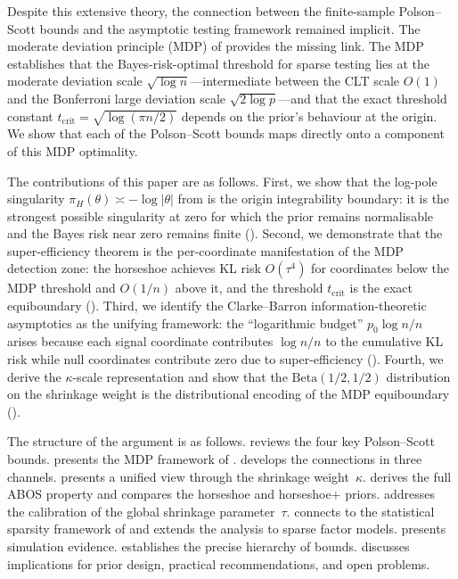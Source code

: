 \documentclass[12pt]{article}
\newcommand{\abs}[1]{\lvert #1 \rvert}
\newcommand{\piH}{\pi_H}
\newcommand{\tcrit}{t_{\mathrm{crit}}}
\begin{document}
Despite this extensive theory, the connection between the finite-sample Polson--Scott bounds and the asymptotic testing framework remained implicit. The moderate deviation principle (MDP) of \citet{datta2026newlook} provides the missing link. The MDP establishes that the Bayes-risk-optimal threshold for sparse testing lies at the moderate deviation scale $\sqrt{\log n}$---intermediate between the CLT scale $O(1)$ and the Bonferroni large deviation scale $\sqrt{2\log p}$---and that the exact threshold constant $\tcrit = \sqrt{\log(\pi n/2)}$ depends on the prior's behaviour at the origin. We show that each of the Polson--Scott bounds maps directly onto a component of this MDP optimality.

The contributions of this paper are as follows. First, we show that the log-pole singularity $\piH(\theta) \asymp -\log\abs{\theta}$ from \citet{carvalho2010horseshoe} is the origin integrability boundary: it is the strongest possible singularity at zero for which the prior remains normalisable and the Bayes risk near zero remains finite (). Second, we demonstrate that the super-efficiency theorem is the per-coordinate manifestation of the MDP detection zone: the horseshoe achieves KL risk $O(\tau^4)$ for coordinates below the MDP threshold and $O(1/n)$ above it, and the threshold $\tcrit$ is the exact equiboundary (). Third, we identify the Clarke--Barron information-theoretic asymptotics as the unifying framework: the ``logarithmic budget'' $p_0 \log n / n$ arises because each signal coordinate contributes $\log n / n$ to the cumulative KL risk while null coordinates contribute zero due to super-efficiency (). Fourth, we derive the $\kappa$-scale representation and show that the $\mathrm{Beta}(1/2,1/2)$ distribution on the shrinkage weight is the distributional encoding of the MDP equiboundary ().

The structure of the argument is as follows.  reviews the four key Polson--Scott bounds.  presents the MDP framework of \citet{datta2026newlook}.  develops the connections in three channels.  presents a unified view through the shrinkage weight~$\kappa$.  derives the full ABOS property and compares the horseshoe and horseshoe+ priors.  addresses the calibration of the global shrinkage parameter~$\tau$.  connects to the statistical sparsity framework of \citet{mccullagh2018statistical} and extends the analysis to sparse factor models.  presents simulation evidence.  establishes the precise hierarchy of bounds.  discusses implications for prior design, practical recommendations, and open problems.
\end{document}
